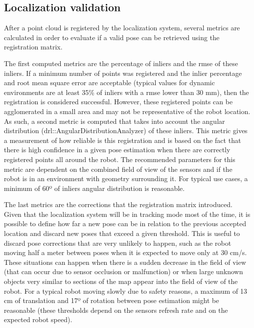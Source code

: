 \subsection{Localization validation}

After a point cloud is registered by the localization system, several metrics are calculated in order to evaluate if a valid pose can be retrieved using the registration matrix.

The first computed metrics are the percentage of inliers and the \gls{rmse} of these inliers. If a minimum number of points was registered and the inlier percentage and root mean square error are acceptable (typical values for dynamic environments are at least 35\% of inliers with a \gls{rmse} lower than 30 mm), then the registration is considered successful. However, these registered points can be agglomerated in a small area and may not be representative of the robot location. As such, a second metric is computed that takes into account the angular distribution (drl::AngularDistributionAnalyzer) of these inliers. This metric gives a measurement of how reliable is this registration and is based on the fact that there is high confidence in a given pose estimation when there are correctly registered points all around the robot. The recommended parameters for this metric are dependent on the combined field of view of the sensors and if the robot is in an environment with geometry surrounding it. For typical use cases, a minimum of 60º of inliers angular distribution is reasonable.

The last metrics are the corrections that the registration matrix introduced. Given that the localization system will be in tracking mode most of the time, it is possible to define how far a new pose can be in relation to the previous accepted location and discard new poses that exceed a given threshold. This is useful to discard pose corrections that are very unlikely to happen, such as the robot moving half a meter between poses when it is expected to move only at 30 cm/s. These situations can happen when there is a sudden decrease in the field of view (that can occur due to sensor occlusion or malfunction) or when large unknown objects very similar to sections of the map appear into the field of view of the robot. For a typical robot moving slowly due to safety reasons, a maximum of 13 cm of translation and 17º of rotation between pose estimation might be reasonable (these thresholds depend on the sensors refresh rate and on the expected robot speed).

